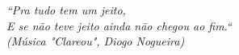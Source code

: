 \begin{epigrafe}
    \vspace*{\fill}
	\begin{flushright}

		\textit{``Pra tudo tem um jeito, \\
		E se não teve jeito ainda não chegou ao fim.`` \\
		(Música "Clareou", Diogo Nogueira)}
	\end{flushright}
\end{epigrafe}
